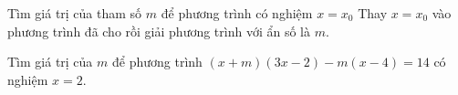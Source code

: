 \begin{dang}{Tìm giá trị của tham số $m$ để phương trình có nghiệm $x=x_0$}
	Thay $x=x_0$ vào phương trình đã cho rồi giải phương trình với ẩn số là $m$.
\end{dang}

\begin{vd}%
	Tìm giá trị của $m$ để phương trình $\left(x+m\right)\left(3x-2\right)-m\left(x-4\right)=14$ có nghiệm $x=2$.
\end{vd}

